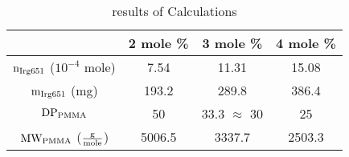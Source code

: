     \begin{table}[H]
        \centering
        \begin{tabular}{c|c|c|c}
            & 2 mole \% & 3 mole \% & 4 mole \%\\ \hline
            $\mathtext[Irg651]{n}$ ($10^{-4}$ mole) & 7.54 & 11.31 & 15.08 \\
            $\mathtext[Irg651]{m}$ (mg) & 193.2 & 289.8 & 386.4 \\
            $\mathtext[PMMA]{DP}$ & 50 & 33.3 $\approx$ 30 & 25\\
            $\mathtext[PMMA]{MW}$ ($\MW$) & 5006.5 & 3337.7 & 2503.3
        \end{tabular}
        \caption{results of Calculations}
        \label{tab:calcs1}
    \end{table}
